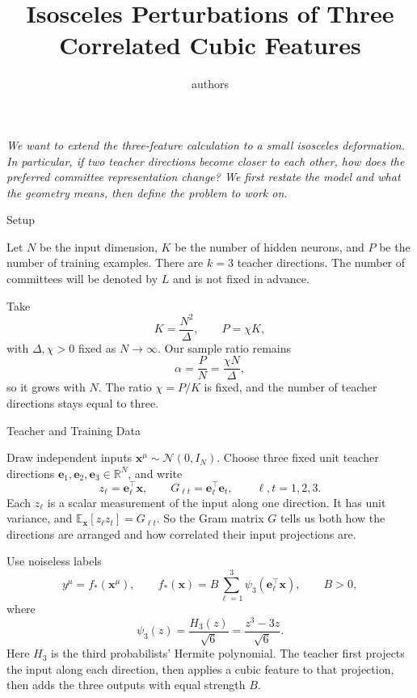 \documentclass[11pt, reqno]{amsart}
\title{Isosceles Perturbations of Three Correlated Cubic Features}
\author{authors}
\date{}
\makeatletter
\def\section{\@startsection{section}{1}%
  \z@{.7\linespacing\@plus\linespacing}{.5\linespacing}%
  {\normalfont\scshape\centering}}
\theoremstyle{notestyle}
\theoremstyle{defstyle}
\makeatother
\begin{document}
\maketitle
\thispagestyle{empty}

\noindent\textit{%
We want to extend the three-feature calculation to a small isosceles deformation. In particular, if two teacher directions become closer to each other, how does the preferred committee representation change? We first restate the model and what the geometry means, then define the problem to work on.}

\section{Setup}

Let $N$ be the input dimension, $K$ be the number of hidden neurons,
and $P$ be the number of training examples. There are $k=3$ teacher
directions. The number of committees will be denoted by $L$ and is
not fixed in advance.

Take
\begin{equation}
 K=\frac{N^2}{\Delta},\qquad P=\chi K,
\end{equation}
with $\Delta,\chi>0$ fixed as $N\to\infty$. Our sample ratio remains
\begin{equation}
 \alpha=\frac PN=\frac{\chi N}{\Delta},
\end{equation}
so it grows with $N$. The ratio $\chi=P/K$ is fixed, and the number
of teacher directions stays equal to three.

\section{Teacher and Training Data}

Draw independent inputs $\mathbf x^\mu\sim\mathcal N(0,I_N)$.
Choose three fixed unit teacher directions
$\mathbf e_1,\mathbf e_2,\mathbf e_3\in\mathbb R^N$, and write
\begin{equation}
 z_\ell=\mathbf e_\ell^\top\mathbf x,\qquad
 G_{\ell t}=\mathbf e_\ell^\top\mathbf e_t,\qquad
 \ell,t=1,2,3.
\end{equation}
Each $z_\ell$ is a scalar measurement of the input along one direction.
It has unit variance, and
$\mathbb E_{\mathbf x}[z_\ell z_t]=G_{\ell t}$. So the Gram matrix
$G$ tells us both how the directions are arranged and how correlated
their input projections are.

Use noiseless labels
\begin{equation}
 y^\mu=f_*(\mathbf x^\mu),\qquad
 f_*(\mathbf x)=B\sum_{\ell=1}^3
 \psi_3(\mathbf e_\ell^\top\mathbf x),\qquad B>0,
\end{equation}
where
\begin{equation}
 \psi_3(z)=\frac{H_3(z)}{\sqrt6}
 =\frac{z^3-3z}{\sqrt6}.
\end{equation}
Here $H_3$ is the third probabilists' Hermite polynomial. The teacher
first projects the input along each direction, then applies a cubic
feature to that projection, then adds the three outputs with equal
strength $B$.
\end{document}
